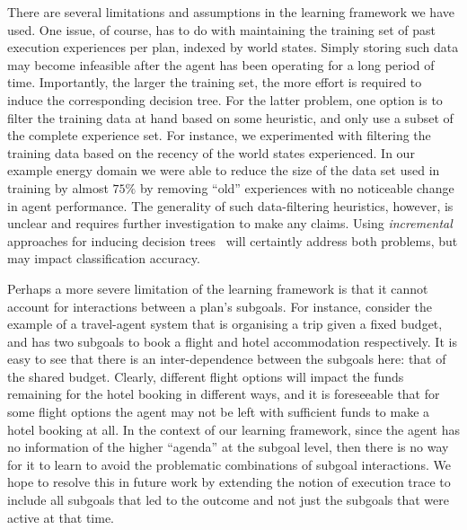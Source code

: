 There are several limitations and assumptions in the learning framework we have used.
One issue, of course, has to do with maintaining the training set of past execution experiences per plan, indexed by world states. Simply storing such data may become infeasible after the agent has been operating for a long period of time. Importantly, the larger the training set, the more effort is required to induce the corresponding decision tree. For the latter problem, one option is to filter the training data at hand based on some heuristic, and only use a subset of the complete experience set. For instance, we experimented with filtering the training data based on the recency of the world states experienced. In our example energy domain we were able to reduce the size of the data set used in training by almost $75\%$ by removing ``old'' experiences with no noticeable change in agent performance. The generality of such data-filtering heuristics, however, is unclear and requires further investigation to make any claims. Using \emph{incremental} approaches for inducing decision trees~\cite{Swere06:Fast,Utgoff:ML89,Utgoff97Decision} will certaintly address both problems, but may impact classification accuracy.

Perhaps a more severe limitation of the learning framework is that it cannot account for interactions between a plan's subgoals. For instance, consider the example of a travel-agent system that is organising a trip given a fixed budget, and has two subgoals to book a flight and hotel accommodation respectively. It is easy to see that there is an inter-dependence between the subgoals here:  that of the shared budget. Clearly, different flight options will impact the funds remaining for the hotel booking in different ways, and it is foreseeable that for some flight options the agent may not be left with sufficient funds to make a hotel booking at all. In the context of our learning framework, since the  agent has no information of the higher ``agenda'' at the subgoal level, then there is no way for it to learn to avoid the problematic combinations of subgoal interactions. We hope to resolve this in future work by extending the notion of execution trace to include all subgoals that led to the outcome and not just the subgoals that were active at that time.

